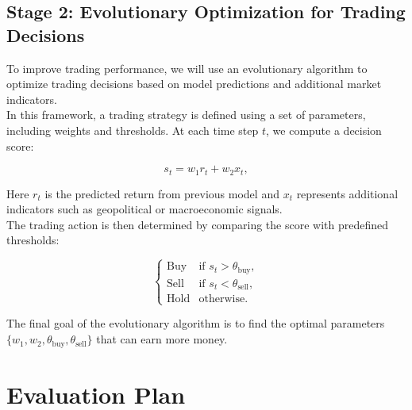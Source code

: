 \documentclass[12pt, a4paper]{article}
\begin{document}
\subsection{Stage 2: Evolutionary Optimization for Trading Decisions}

\noindent To improve trading performance, we will use an evolutionary algorithm to optimize trading decisions based on model predictions and additional market indicators.\\

\noindent In this framework, a trading strategy is defined using a set of parameters, including weights and thresholds. At each time step $t$, we compute a decision score:

\[
s_t = w_1 r_t + w_2 x_t,
\]

\noindent Here $r_t$ is the predicted return from previous model and $x_t$ represents additional indicators such as geopolitical or macroeconomic signals.\\

\noindent The trading action is then determined by comparing the score with predefined thresholds:

\[
\begin{cases}
\text{Buy} & \text{if } s_t > \theta_{\text{buy}}, \\
\text{Sell} & \text{if } s_t < \theta_{\text{sell}}, \\
\text{Hold} & \text{otherwise}.
\end{cases}
\]

\noindent The final goal of the evolutionary algorithm is to find the optimal parameters $\{w_1, w_2, \theta_{\text{buy}}, \theta_{\text{sell}}\}$ that can earn more money. 

\section{Evaluation Plan}
\end{document}
